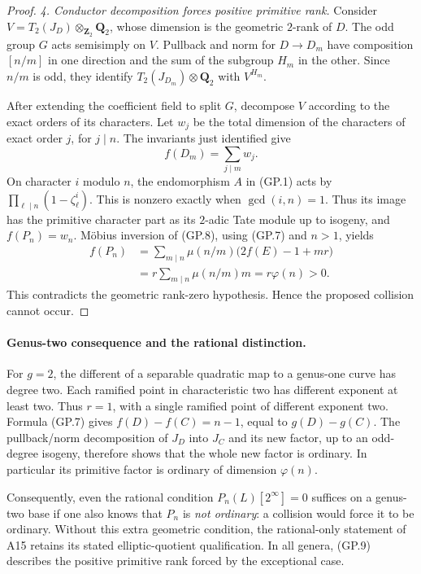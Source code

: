 \begin{proof}
\emph{4. Conductor decomposition forces positive primitive rank.}
Consider
$V=T_2(J_D)\otimes_{\mathbf Z_2}\mathbf Q_2$,
whose dimension is the geometric $2$-rank of $D$.
The odd group $G$ acts semisimply on $V$.
Pullback and norm for $D\to D_m$ have composition
$[n/m]$ in one direction and the sum of the subgroup
$H_m$ in the other.  Since $n/m$ is odd, they identify
$T_2(J_{D_m})\otimes\mathbf Q_2$ with $V^{H_m}$.

After extending the coefficient field to split $G$, decompose
$V$ according to the exact orders of its characters.
Let $w_j$ be the total dimension of the characters of exact
order $j$, for $j\mid n$.  The invariants just identified give
\[
                           f(D_m)=\sum_{j\mid m}w_j.
 \tag{GP.8}
\]
On character $i$ modulo $n$, the endomorphism $A$ in (GP.1)
acts by
$\prod_{\ell\mid n}(1-\zeta_\ell^i)$.
This is nonzero exactly when $\gcd(i,n)=1$.
Thus its image has the primitive character part as its
$2$-adic Tate module up to isogeny, and
$f(P_n)=w_n$.
M\"obius inversion of (GP.8), using (GP.7) and $n>1$, yields
\[
\begin{aligned}
 f(P_n)
   &=\sum_{m\mid n}\mu(n/m)\bigl(2f(E)-1+mr\bigr)\\
   &=r\sum_{m\mid n}\mu(n/m)m
     =r\varphi(n)>0.
\end{aligned}
 \tag{GP.9}
\]
This contradicts the geometric rank-zero hypothesis.
Hence the proposed collision cannot occur.
\end{proof}

\paragraph{Genus-two consequence and the rational distinction.}
For $g=2$, the different of a separable quadratic map to a
genus-one curve has degree two.  Each ramified point in
characteristic two has different exponent at least two.
Thus $r=1$, with a single ramified point of different exponent
two.  Formula (GP.7) gives
$f(D)-f(C)=n-1$, equal to $g(D)-g(C)$.
The pullback/norm decomposition of $J_D$ into $J_C$ and its
new factor, up to an odd-degree isogeny, therefore shows that
the whole new factor is ordinary.  In particular its primitive
factor is ordinary of dimension $\varphi(n)$.

Consequently, even the rational condition
$P_n(L)[2^\infty]=0$ suffices on a genus-two base if one also
knows that $P_n$ is \emph{not ordinary}: a collision would force
it to be ordinary.  Without this extra geometric condition,
the rational-only statement of A15 retains its stated
elliptic-quotient qualification.  In all genera, (GP.9)
describes the positive primitive rank forced by the
exceptional case.

